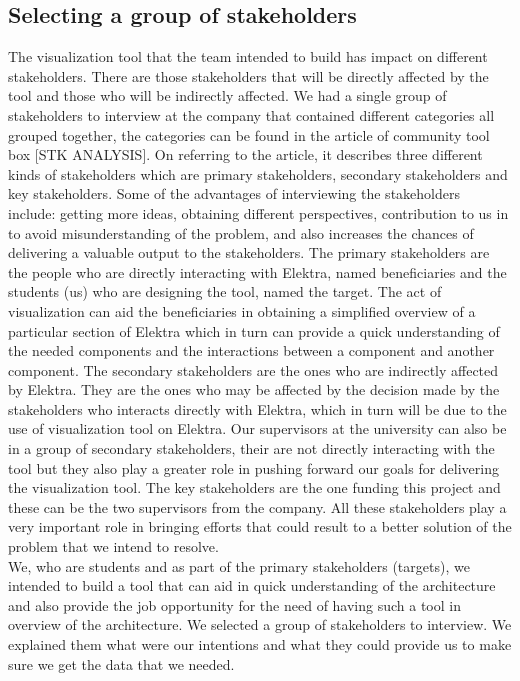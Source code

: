 \subsection{Selecting a group of stakeholders}
The visualization tool that the team intended to build has impact on different stakeholders. There are those stakeholders that will be directly affected by the tool and those who will be indirectly affected. We had a single group of stakeholders to interview at the company that contained different categories all grouped together, the categories can be found in the article of community tool box [STK ANALYSIS]. On referring to the article, it describes three different kinds of stakeholders which are primary stakeholders, secondary stakeholders and key stakeholders. Some of the advantages of interviewing the stakeholders include:  getting more ideas, obtaining different perspectives, contribution to us in to avoid misunderstanding of the problem, and also increases the chances of delivering a valuable output to the stakeholders. The primary stakeholders are the people who are directly interacting with Elektra, named beneficiaries and the students (us) who are designing the tool, named the target. The act of visualization can aid the beneficiaries in obtaining a simplified overview of a particular section of Elektra which in turn can provide a quick understanding of the needed components and the interactions between a component and another component. The secondary stakeholders are the ones who are indirectly affected by Elektra. They are the ones who may be affected by the decision made by the stakeholders who interacts directly with Elektra, which in turn will be due to the use of visualization tool on Elektra. Our supervisors at the university can also be in a group of secondary stakeholders, their are not directly interacting with the tool but they also play a greater role in pushing forward our goals for delivering the visualization tool. The key stakeholders are the one funding this project and these can be the two supervisors from the company. All these stakeholders play a very important role in bringing efforts that could result to a better solution of the problem that we intend to resolve.\\
We, who are students and as part of the primary stakeholders (targets), we intended to build a tool that can aid in quick understanding of the architecture and also provide the job opportunity for the need of having such a tool in overview of the architecture. We selected a group of stakeholders to interview. We explained them what were our intentions and what they could provide us to make sure we get the data that we needed.\todo{[to be filled in]}

